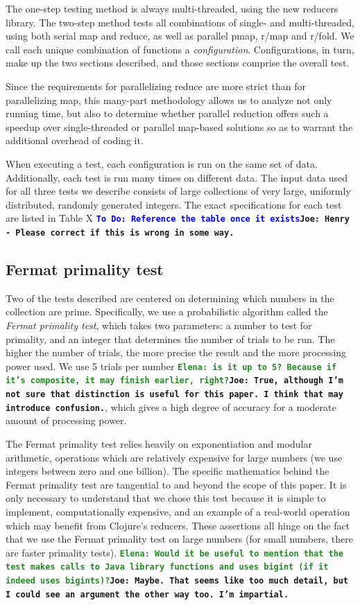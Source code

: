 \documentclass[12pt]{article}
\newcommand{\comment}[1]{{\bf \tt  {#1}}}
\newcommand{\emcomment}[1]{\textcolor{ForestGreen}{\comment{Elena: {#1}}}}
\newcommand{\joecomment}[1]{\textcolor{JoesGold}{\comment{Joe: {#1}}}}
\newcommand{\todo}[1]{\textcolor{blue}{\comment{To Do: {#1}}}}
\begin{document}
The one-step testing method is always multi-threaded, using the new reducers library. The two-step method tests all combinations of single- and multi-threaded, using both serial map and reduce, as well as parallel pmap, r/map and r/fold. We call each unique combination of functions a \emph{configuration}. Configurations, in turn, make up the two sections described, and those sections comprise the overall test.

Since the requirements for parallelizing reduce are more strict than for parallelizing map, this many-part methodology allows us to analyze not only running time, but also to determine whether parallel reduction offers such a speedup over single-threaded or parallel map-based solutions so as to warrant the additional overhead of coding it.

When executing a test, each configuration is run on the same set of data. Additionally, each test is run many times on different data. The input data used for all three tests we describe consists of large collections of very large, uniformly distributed, randomly generated integers. The exact specifications for each test are listed in Table X \todo{Reference the table once it exists}\joecomment{Henry - Please correct if this is wrong in some way.}

\subsection{Fermat primality test}\label{sec:fermat}
Two of the tests described are centered on determining which numbers in the collection are prime. Specifically, we use a probabilistic algorithm called the \emph{Fermat primality test}, which takes two parameters: a number to test for primality, and an integer that determines the number of trials to be run. The higher the number of trials, the more precise the result and the more processing power used. We use 5 trials per number \emcomment{is it up to 5? Because if it's composite, it may finish earlier, right?}\joecomment{True, although I'm not sure that distinction is useful for this paper. I think that may introduce confusion.}, which gives a high degree of accuracy for a moderate amount of processing power.

The Fermat primality test relies heavily on exponentiation and modular arithmetic, operations which are relatively expensive for large numbers (we use integers between zero and one billion). The specific mathematics behind the Fermat primality test are tangential to and beyond the scope of this paper. It is only necessary to understand that we chose this test because it is simple to implement, computationally expensive, and an example of a real-world operation which may benefit from Clojure's reducers. These assertions all hinge on the fact that we use the Fermat primality test on large numbers (for small numbers, there are faster primality tests).
\emcomment{Would it be useful to mention that the test makes calls to Java library functions and uses bigint (if it indeed uses bigints)?}\joecomment{Maybe. That seems like too much detail, but I could see an argument the other way too. I'm impartial.}
\end{document}
